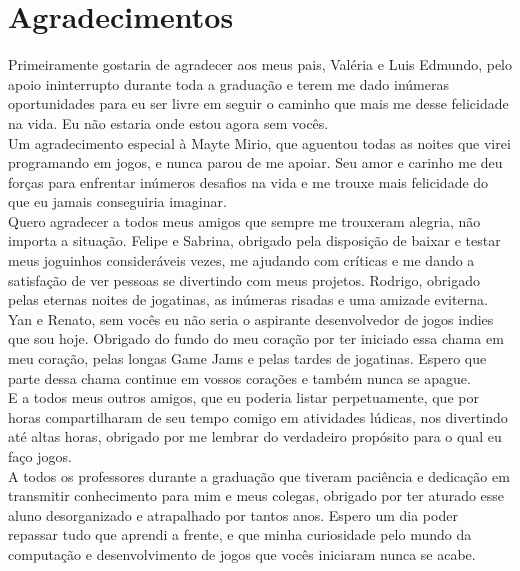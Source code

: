 \chapter*{Agradecimentos}

  Primeiramente gostaria de agradecer aos meus pais, Valéria e Luis Edmundo, pelo apoio ininterrupto durante toda a graduação e terem me dado inúmeras oportunidades para eu ser livre em seguir o caminho que mais me desse felicidade na vida. Eu não estaria onde estou agora sem vocês.\\

Um agradecimento especial à Mayte Mirio, que aguentou todas as noites que virei programando em jogos, e nunca parou de me apoiar. Seu amor e carinho me deu forças para enfrentar inúmeros desafios na vida e me trouxe mais felicidade do que eu jamais conseguiria imaginar.\\

Quero agradecer a todos meus amigos que sempre me trouxeram alegria, não importa a situação. Felipe e Sabrina, obrigado pela disposição de baixar e testar meus joguinhos consideráveis vezes, me ajudando com críticas e me dando a satisfação de ver pessoas se divertindo com meus projetos. Rodrigo, obrigado pelas eternas noites de jogatinas, as inúmeras risadas e uma amizade eviterna. Yan e Renato, sem vocês eu não seria o aspirante desenvolvedor de jogos indies que sou hoje. Obrigado do fundo do meu coração por ter iniciado essa chama em meu coração, pelas longas Game Jams e pelas tardes de jogatinas. Espero que parte dessa chama continue em vossos corações e também nunca se apague.\\

E a todos meus outros amigos, que eu poderia listar perpetuamente, que por horas compartilharam de seu tempo comigo em atividades lúdicas, nos divertindo até altas horas, obrigado por me lembrar do verdadeiro propósito para o qual eu faço jogos.\\

A todos os professores durante a graduação que tiveram paciência e dedicação em transmitir conhecimento para mim e meus colegas, obrigado por ter aturado esse aluno desorganizado e atrapalhado por tantos anos. Espero um dia poder repassar tudo que aprendi a frente, e que minha curiosidade pelo mundo da computação e desenvolvimento de jogos que vocês iniciaram nunca se acabe.\\

